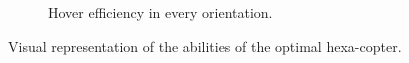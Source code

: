 \begin{figure}[!ht]
{\begin{subfigure}[b]{0.47\textwidth}
    \caption{Hover efficiency in every orientation.} \label{fig:hexa_hspace}
  \end{subfigure}}
  \caption{Visual representation of the abilities of the optimal hexa-copter.}
  \label{fig:Hexacopter_spaces}
\end{figure}

\begin{figure}[!ht]
\end{figure}
